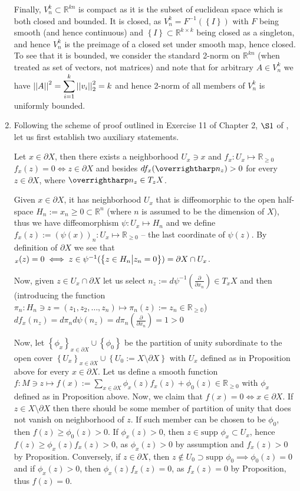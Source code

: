 \documentclass[8pt]{article} %
\begin{document}
\begin{enumerate}[label=\bfseries \arabic*.]
{		Finally, $V_n^k\subset\mathbb{R}^{kn}$ is compact as it is the subset of euclidean space which is both closed and bounded. It is closed, as
		$V_n^k=F^{-1}(\left\{I\right\})$ with $F$ being smooth (and hence continuous) and $\left\{I\right\}\subset\mathbb{R}^{k\times k}$ being closed
		as a singleton, and hence $V_n^k$ is the preimage of a closed set under smooth map, hence closed. To see that it is bounded, we consider the standard
		2-norm on $\mathbb{R}^{kn}$ (when treated as set of vectors, not matrices)
		and note that for arbitrary $A\in V_n^k$ we have $\mynorm{A}^2=\sum_{i=1}^k\mynorm{v_i}_2^2=k$ and hence 2-norm of all members of $V_n^k$ is uniformly
		bounded.
		}
		\item{Following the scheme of proof outlined in Exercise 11 of Chapter 2, $\S1$ of \cite{gp}, let us first establish two auxiliary statements.
			\begin{myprop}Let $x\in\partial X$, then there exists a neighborhood $U_x\ni x$
				and $f_x:U_x\mapsto\mathbb{R}_{\geq 0}$ 
				$f_x(z)=0\iff z\in\partial X$ and besides $df_x(\myvec{n_z})>0$
				for every $z\in\partial X$, where $\myvec{n_z}\in T_z X$.
		\end{myprop}
		\begin{myproof}
			Given $x\in\partial X$, it has neighborhood $U_x$ that is diffeomorphic to the open half-space
			$H_n:={x_n\geq 0}\subset\mathbb{R}^n$ (where $n$ is assumed to be the dimension of $X$), thus we have
			diffeomorphism $\psi: U_x\mapsto H_n$ and we define $f_x(z):=\left(\psi(x)\right)_n:
			U_x\mapsto\mathbb{R}_{\geq 0}$ -- the last coordinate
			of $\psi(z)$. By definition of $\partial X$ we see that $_x(z)=0\iff z\in\psi^{-1}(\left\{z\in H_n\big| z_n=0\right\})=\partial X\cap U_x$.

			Now, given $z\in U_x\cap\partial X$
			let us select $n_z:=d\psi^{-1}(\frac{\partial}{\partial x_n})\in T_x X$ and then (introducing the function
			$\pi_n:H_n\ni z=(z_1,z_2,\dots,z_n)\mapsto \pi_n(z):=z_n\in\mathbb{R_{\geq 0}}$)
			$df_x(n_z)=d\pi_n d\psi (n_z)=d\pi_n(\frac{\partial}{\partial x_n})=1>0$ 
		\myqed\end{myproof}
		Now, let $\left\{\phi_x\right\}_{x\in\partial X}\cup\left\{\phi_0\right\}$ be the partition of unity subordinate
		to the open cover $\left\{U_x\right\}_{x\in\partial X}\cup\left\{U_0:=X\setminus\partial X\right\}$ with
		$U_x$ defined as in Proposition above for every $x\in\partial X$. Let us define a smooth function $f:M\ni z\mapsto
		f(x):=\sum_{x\in\partial X}\phi_x(z) f_x(z)+\phi_0(z)\in\mathbb{R}_{\geq 0}$
		with $\phi_x$ defined as in Proposition above. Now, we claim that $f(x)=0\iff
		x\in\partial X$. If $z\in X\setminus\partial X$
		then there should be some member of partition of unity that does not vanish on neighborhood of $z$. If such
		member can be chosen to be $\phi_0$, then $f(z)\geq \phi_0(z)>0$. If $\phi_x(z)>0$, then
		$z\in\mbox{supp }\phi_x\subset U_x$, hence $f(z)\geq \phi_x(z) f_x(z)>0$, as $\phi_x(z)>0$ by assumption
		and $f_x(z)>0$ by Proposition. Conversely, if $z\in\partial X$, then $z\notin U_0\supset
		\mbox{supp }\phi_0\implies \phi_0(z)=0$ and if $\phi_x(z)>0$, then $\phi_x(z)f_x(z)=0$, as $f_x(z)=0$ by Proposition,
		thus $f(z)=0$.

}
\end{enumerate}
\end{document}

